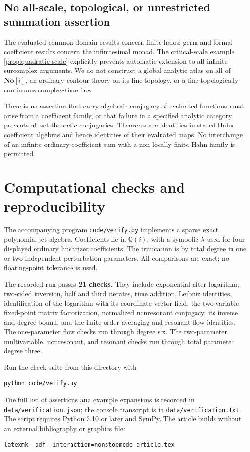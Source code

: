 \documentclass[11pt,letterpaper]{article}
\theoremstyle{definition}
\theoremstyle{remark}
\newcommand{\Q}{\mathbb Q}
\newcommand{\No}{\mathbf{No}}
\numberwithin{equation}{section}
\begin{document}
\subsection{No all-scale, topological, or unrestricted summation assertion}
The evaluated common-domain results concern finite halos; germ and formal
coefficient results concern the infinitesimal monad. The critical-scale
example \cref{prop:quadratic-scale} explicitly prevents automatic extension
to all infinite surcomplex arguments. We do not construct a global analytic
atlas on all of $\No[i]$, an ordinary contour theory on its fine topology,
or a fine-topologically continuous complex-time flow.

There is no assertion that every algebraic conjugacy of evaluated functions
must arise from a coefficient family, or that failure in a specified analytic
category prevents all set-theoretic conjugacies. Theorems are identities in
stated Hahn coefficient algebras and hence identities of their evaluated
maps. No interchange of an infinite ordinary coefficient sum with a
non-locally-finite Hahn family is permitted.

\section{Computational checks and reproducibility}\label{sec:verification}
The accompanying program \texttt{code/verify.py} implements a sparse exact
polynomial jet algebra. Coefficients lie in $\Q(i)$, with a symbolic
$\lambda$ used for four displayed ordinary linearizer coefficients. The
truncation is by total degree in one or two independent perturbation
parameters. All comparisons are exact; no floating-point tolerance is used.

The recorded run passes \textbf{21 checks}. They include exponential after
logarithm, two-sided inversion, half and third iterates, time addition,
Leibniz identities, identification of the logarithm with its coordinate
vector field, the two-variable fixed-point matrix factorization, normalized
nonresonant conjugacy, its inverse and degree bound, and the finite-order
averaging and resonant flow identities. The one-parameter flow checks run
through degree six. The two-parameter multivariable, nonresonant, and
resonant checks run through total parameter degree three.

Run the check suite from this directory with
\begin{verbatim}
python code/verify.py
\end{verbatim}
The full list of assertions and example expansions is recorded in
\texttt{data/verification.json}; the console transcript is in
\texttt{data/verification.txt}. The script requires Python 3.10 or later and
SymPy. The article builds without an external bibliography or graphics file:
\begin{verbatim}
latexmk -pdf -interaction=nonstopmode article.tex
\end{verbatim}
\end{document}
